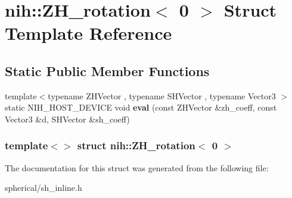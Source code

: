 \hypertarget{structnih_1_1_z_h__rotation_3_010_01_4}{
\section{nih\-:\-:\-Z\-H\-\_\-rotation$<$ 0 $>$ \-Struct \-Template \-Reference}
\label{structnih_1_1_z_h__rotation_3_010_01_4}
}
\subsection*{\-Static \-Public \-Member \-Functions}
\begin{DoxyCompactItemize}
\item 
\hypertarget{structnih_1_1_z_h__rotation_3_010_01_4_aad3ad0b1963ff699c40d0ed4b066f08d}{
{\footnotesize template$<$typename Z\-H\-Vector , typename S\-H\-Vector , typename Vector3 $>$ }\\static \-N\-I\-H\-\_\-\-H\-O\-S\-T\-\_\-\-D\-E\-V\-I\-C\-E void {\bfseries eval} (const \-Z\-H\-Vector \&zh\-\_\-coeff, const \-Vector3 \&d, \-S\-H\-Vector \&sh\-\_\-coeff)}
\label{structnih_1_1_z_h__rotation_3_010_01_4_aad3ad0b1963ff699c40d0ed4b066f08d}

\end{DoxyCompactItemize}
\subsubsection*{template$<$$>$ struct nih\-::\-Z\-H\-\_\-rotation$<$ 0 $>$}



\-The documentation for this struct was generated from the following file\-:\begin{DoxyCompactItemize}
\item 
spherical/sh\-\_\-inline.\-h\end{DoxyCompactItemize}
